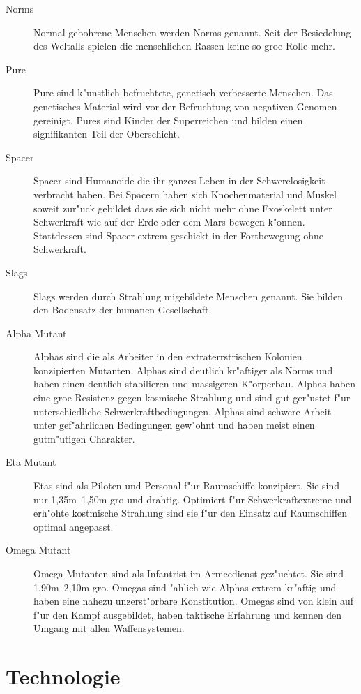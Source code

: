 \begin{appendices}
\begin{description}
\item [Norms] Normal gebohrene Menschen werden Norms genannt. Seit der Besiedelung des Weltalls spielen die
      menschlichen Rassen keine so gro\3e Rolle mehr.
\item [Pure] Pure sind k"unstlich befruchtete, genetisch verbesserte Menschen. Das genetisches Material wird vor der
      Befruchtung von negativen Genomen gereinigt. Pures sind Kinder der Superreichen und bilden einen signifikanten Teil der Oberschicht.
\item [Spacer] Spacer sind Humanoide die ihr ganzes Leben in der Schwerelosigkeit verbracht haben. Bei Spacern haben sich
      Knochenmaterial und Muskel soweit zur"uck gebildet dass sie sich nicht mehr ohne Exoskelett unter Schwerkraft wie auf der Erde oder dem Mars bewegen k"onnen. Stattdessen sind Spacer extrem geschickt in der Fortbewegung ohne Schwerkraft.
\item [Slags] Slags werden durch Strahlung mi\3gebildete Menschen genannt. Sie bilden den Bodensatz der
      humanen Gesellschaft.
\item [Alpha Mutant] Alphas sind die als Arbeiter in den extraterrstrischen Kolonien konzipierten Mutanten.
      Alphas sind deutlich kr"aftiger als Norms und haben einen deutlich stabilieren und massigeren K"orperbau. Alphas haben eine gro\3e Resistenz gegen kosmische Strahlung und sind gut ger"ustet f"ur unterschiedliche Schwerkraftbedingungen. Alphas sind schwere Arbeit unter gef"ahrlichen Bedingungen gew"ohnt und haben meist einen gutm"utigen Charakter.
\item [Eta Mutant] Etas sind als Piloten und Personal f"ur Raumschiffe konzipiert. Sie sind nur 1,35m--1,50m gro\3
      und drahtig. Optimiert f"ur Schwerkraftextreme und erh"ohte kostmische Strahlung sind sie f"ur den Einsatz auf Raumschiffen optimal angepasst.
\item [Omega Mutant] Omega Mutanten sind als Infantrist im Armeedienst gez"uchtet. Sie sind 1,90m--2,10m gro\3.
      Omegas sind "ahlich wie Alphas extrem kr"aftig und haben eine nahezu unzerst"orbare Konstitution. Omegas sind von klein auf f"ur den Kampf ausgebildet, haben taktische Erfahrung und kennen den Umgang mit allen Waffensystemen.
\end{description}

\section{Technologie}


\end{appendices}
